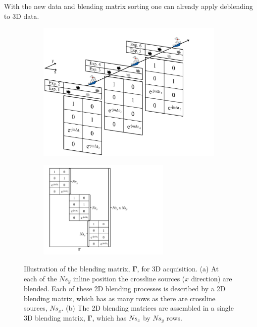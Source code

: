 
With the new data and blending matrix sorting one can already apply deblending to 3D data.

\begin{figure}

	\begin{subfigure}[t]{0.5\textwidth}
		\centering
		\includegraphics[width = \textwidth]{Plots/DrawingsCartesianFormat1}
		\caption{}
		\label{fig:Ch-Theory-3D-BlendedAcquisition}
	\end{subfigure}
	\begin{subfigure}[t]{0.5\textwidth}
		\centering
		\includegraphics[width = 0.7\textwidth]{Plots/DrawingsCartesianFormat2}
		\caption{}
		\label{fig:Ch-Theory-3D-BlendingMatrix}
	\end{subfigure}
	
	\caption{Illustration of the blending matrix, $\mathbf{\Gamma}$, for 3D acquisition. (a) At each of the $Ns_y$ inline position the crossline sources ($x$ direction) are blended. Each of these 2D blending processes is described by a 2D blending matrix, which has as many rows as there are crossline sources, $Ns_x$. (b) The 2D blending matrices are assembled in a single 3D blending matrix, $\mathbf{\Gamma}$, which has $Ns_x$ by $Ns_y$ rows.}
	\label{fig:Ch-Theory-3D-BlendingMatrix-Design}

\end{figure}

